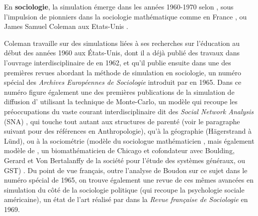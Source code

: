 
En \textbf{sociologie}, la simulation émerge dans les années 1960-1970 selon \textcites[50]{Manzo2005}[16]{Manzo2007}, sous l'impulsion de pionniers dans la sociologie mathématique comme \textcites{Boudon1967, Gremy1971} en France  , ou James Samuel Coleman aux Etats-Unis .

Coleman travaille sur des simulations liées à ses recherches sur l'éducation au début des années 1960 aux États-Unis, dont il a déjà publié des travaux dans l'ouvrage interdisciplinaire de \textcite{Guetzkow1962} en 1962, et qu'il publie ensuite \autocite{Coleman1965} dans une des premières revues abordant la méthode de simulation en sociologie, un numéro spécial des \textit{Archives Européennes de Sociologie} introduit par \textcite{Boudon1965} en 1965. Dans ce  numéro figure également une des premières publications de la simulation de diffusion d'\textcite{Hagerstrand1965} utilisant la technique de Monte-Carlo, un modèle qui recoupe les préoccupations du vaste courant interdisciplinaire dit des \textit{Social Network Analysis} (SNA) \autocite{Bernard2005}, qui touche tout autant aux structures de parenté (voir le paragraphe suivant pour des références en Anthropologie), qu'à la géographie (Hägerstrand à Lünd), ou à la sociométrie (modèle du sociologue mathématicien \textcite{Coleman1957}, mais également modèle de \textcite{Rapoport1961}, un biomathématicien de Chicago et cofondateur avec Boulding, Gerard et Von Bertalanffy de la société pour l'étude des systèmes généraux, ou GST) . Du point de vue français, outre l'analyse de Boudon sur ce sujet dans le numéro spécial de 1965, on trouve également une revue de ces mêmes avancées en simulation du côté de la sociologie politique (qui recoupe la psychologie sociale américaine), un état de l'art réalisé par \textcite{Padioleau1969} dans la \textit{Revue française de Sociologie} en 1969.

